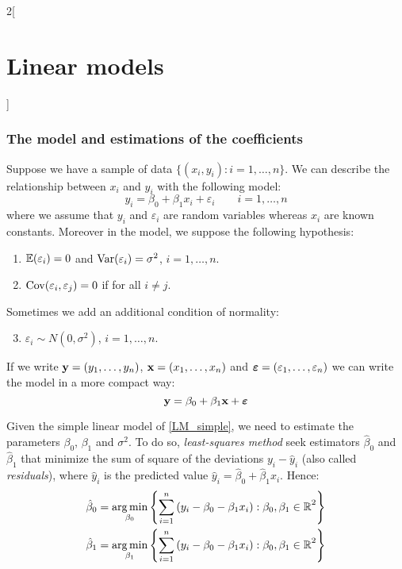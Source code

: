\documentclass[../../../main_math.tex]{subfiles}
\begin{document}
\begin{multicols}{2}[\section{Linear models}]
  \subsubsection{The model and estimations of the coefficients}
  \begin{definition}
    Suppose we have a sample of data $\{(x_i,y_i):i=1,\ldots,n\}$. We can describe the relationship between $x_i$ and $y_i$ with the following model:
    $$y_i=\beta_0+\beta_1x_i+\varepsilon_i\qquad i=1,\ldots,n$$
    where we assume that $y_i$ and $\varepsilon_i$ are random variables whereas $x_i$ are known constants. Moreover in the model, we suppose the following hypothesis:
    \begin{enumerate}
      \item $\mathbb{E}(\varepsilon_i)=0$ and $\mathrm{Var}(\varepsilon_i)=\sigma^2$, $i=1,\ldots,n$.
      \item $\mathrm{Cov}(\varepsilon_i,\varepsilon_j)=0$ if for all $i\ne j$.
    \end{enumerate}
    Sometimes we add an additional condition of normality:
    \begin{enumerate}\setcounter{enumii}{2}
      \item $\varepsilon_i\sim N(0,\sigma^2)$, $i=1,\ldots,n$.
    \end{enumerate}
    If we write $\boldsymbol{\mathrm{y}}=(y_1,\ldots,y_n)$, $\boldsymbol{\mathrm{x}}=(x_1,\ldots,x_n)$ and $\boldsymbol{\mathrm{\varepsilon}}=(\varepsilon_1,\ldots,\varepsilon_n)$ we can write the model in a more compact way:
    \begin{equation}\label{LM_simple}
      \boldsymbol{\mathrm{y}}=\beta_0+\beta_1\boldsymbol{\mathrm{x}}+\boldsymbol{\mathrm{\varepsilon}}
    \end{equation}
  \end{definition}
  \begin{proposition}
    Given the simple linear model of \cref{LM_simple}, we need to estimate the parameters $\beta_0$, $\beta_1$ and $\sigma^2$. To do so, \emph{least-squares method} seek estimators $\hat\beta_0$ and $\hat\beta_1$ that minimize the sum of square of the deviations $y_i-\hat{y}_i$ (also called \emph{residuals}), where $\hat{y}_i$ is the predicted value $\hat{y}_i=\hat\beta_0+\hat\beta_1 x_i$. Hence:
    \begin{align*}
      \hat\beta_0 & =\operatorname*{arg\,min}_{\beta_0}\left\{\sum_{i=1}^n{(y_i-\beta_0-\beta_1x_i):\beta_0,\beta_1\in\mathbb{R}}^2\right\} \\
      \hat\beta_1 & =\operatorname*{arg\,min}_{\beta_1}\left\{\sum_{i=1}^n{(y_i-\beta_0-\beta_1x_i):\beta_0,\beta_1\in\mathbb{R}}^2\right\}
    \end{align*}

\end{proposition}
\end{multicols}
\end{document}
